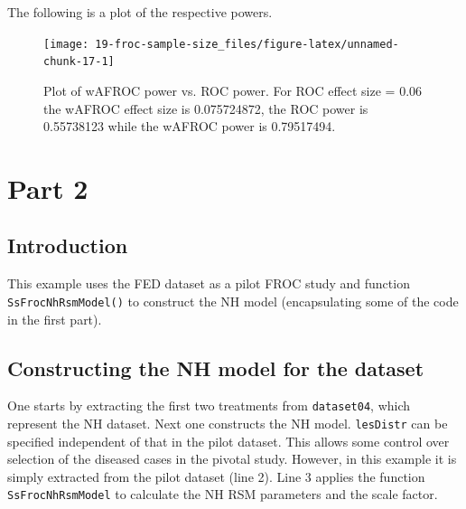 \documentclass[
]{book}
\begin{document}
The following is a plot of the respective powers.

\begin{figure}

{\centering \texttt{[image: 19-froc-sample-size\_files/figure-latex/unnamed-chunk-17-1]} 

}

\caption{Plot of wAFROC power vs. ROC power. For ROC effect size = 0.06 the wAFROC effect size is 0.075724872, the ROC power is 0.55738123 while the wAFROC power is 0.79517494.}\label{fig:unnamed-chunk-17}
\end{figure}

\hypertarget{part-2}{%
\section{Part 2}\label{part-2}}

\hypertarget{introduction}{%
\subsection{Introduction}\label{introduction}}

This example uses the FED dataset as a pilot FROC study and function \texttt{SsFrocNhRsmModel()} to construct the NH model (encapsulating some of the code in the first part).

\hypertarget{constructing-the-nh-model-for-the-dataset}{%
\subsection{Constructing the NH model for the dataset}\label{constructing-the-nh-model-for-the-dataset}}

One starts by extracting the first two treatments from \texttt{dataset04}, which represent the NH dataset. Next one constructs the NH model. \texttt{lesDistr} can be specified independent of that in the pilot dataset. This allows some control over selection of the diseased cases in the pivotal study. However, in this example it is simply extracted from the pilot dataset (line 2). Line 3 applies the function \texttt{SsFrocNhRsmModel} to calculate the NH RSM parameters and the scale factor.
\end{document}
